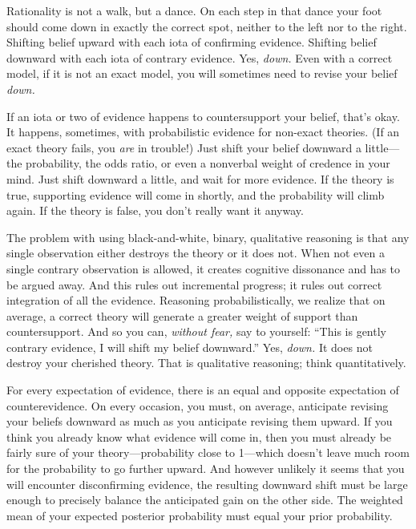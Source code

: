 {
 Rationality is not a walk, but a dance. On each step in that dance
your foot should come down in exactly the correct spot, neither to the
left nor to the right. Shifting belief upward with each iota of
confirming evidence. Shifting belief downward with each iota of
contrary evidence. Yes, \textit{down.} Even with a correct model, if it
is not an exact model, you will sometimes need to revise your belief
\textit{down.}}

{
 If an iota or two of evidence happens to countersupport your
belief, that's okay. It happens, sometimes, with
probabilistic evidence for non-exact theories. (If an exact theory
fails, you \textit{are} in trouble!) Just shift your belief downward a
little---the probability, the odds ratio, or even a nonverbal weight of
credence in your mind. Just shift downward a little, and wait for more
evidence. If the theory is true, supporting evidence will come in
shortly, and the probability will climb again. If the theory is false,
you don't really want it anyway.}

{
 The problem with using black-and-white, binary, qualitative
reasoning is that any single observation either destroys the theory or
it does not. When not even a single contrary observation is allowed, it
creates cognitive dissonance and has to be argued away. And this rules
out incremental progress; it rules out correct integration of all the
evidence. Reasoning probabilistically, we realize that on average, a
correct theory will generate a greater weight of support than
countersupport. And so you can, \textit{without fear,} say to yourself:
``This is gently contrary evidence, I will shift my
belief downward.'' Yes, \textit{down.} It does not
destroy your cherished theory. That is qualitative reasoning; think
quantitatively.}

{
 For every expectation of evidence, there is an equal and opposite
expectation of counterevidence. On every occasion, you must, on
average, anticipate revising your beliefs downward as much as you
anticipate revising them upward. If you think you already know what
evidence will come in, then you must already be fairly sure of your
theory---probability close to 1---which doesn't leave
much room for the probability to go further upward. And however
unlikely it seems that you will encounter disconfirming evidence, the
resulting downward shift must be large enough to precisely balance the
anticipated gain on the other side. The weighted mean of your expected
posterior probability must equal your prior probability.}

